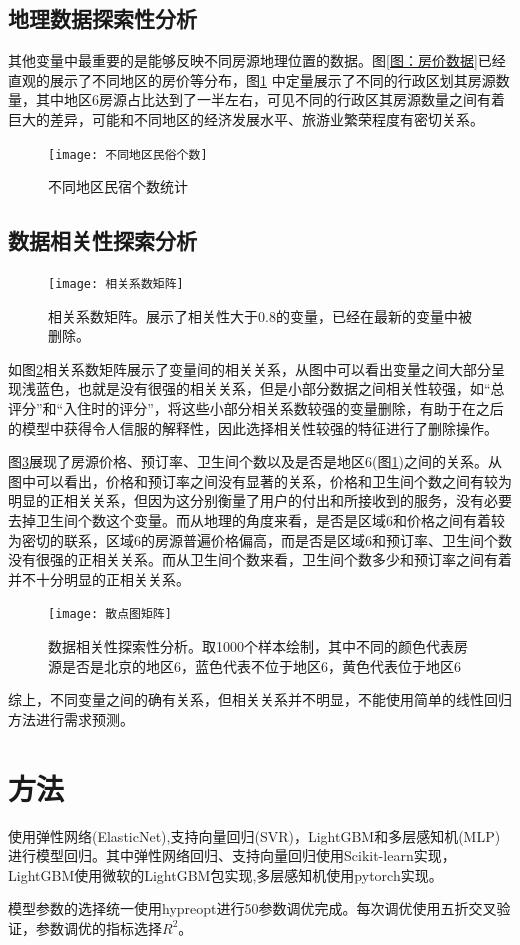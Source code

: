 \documentclass{article}
\begin{document}
\begin{multicols}{2}
\subsection{地理数据探索性分析}
其他变量中最重要的是能够反映不同房源地理位置的数据。图\ref{图：房价数据}已经直观的展示了不同地区的房价等分布，图\ref{fig:不同地区民宿个数} 中定量展示了不同的行政区划其房源数量，其中地区6房源占比达到了一半左右，可见不同的行政区其房源数量之间有着巨大的差异，可能和不同地区的经济发展水平、旅游业繁荣程度有密切关系。
\begin{figure}[H]
	\centering
	\texttt{[image: 不同地区民俗个数]}
	\caption{不同地区民宿个数统计}
	\label{fig:不同地区民宿个数}
\end{figure}
\subsection{数据相关性探索分析}
\begin{figure}
	\centering
	\texttt{[image: 相关系数矩阵]}
	\caption{相关系数矩阵。展示了相关性大于0.8的变量，已经在最新的变量中被删除。}
	\label{fig:相关系数矩阵}
\end{figure}
如图\ref{fig:相关系数矩阵}相关系数矩阵展示了变量间的相关关系，从图中可以看出变量之间大部分呈现浅蓝色，也就是没有很强的相关关系，但是小部分数据之间相关性较强，如“总评分”和“入住时的评分”，将这些小部分相关系数较强的变量删除，有助于在之后的模型中获得令人信服的解释性，因此选择相关性较强的特征进行了删除操作。
\par 图\ref{fig:散点图矩阵}展现了房源价格、预订率、卫生间个数以及是否是地区6(图\ref{fig:不同地区民宿个数})之间的关系。从图中可以看出，价格和预订率之间没有显著的关系，价格和卫生间个数之间有较为明显的正相关关系，但因为这分别衡量了用户的付出和所接收到的服务，没有必要去掉卫生间个数这个变量。而从地理的角度来看，是否是区域6和价格之间有着较为密切的联系，区域6的房源普遍价格偏高，而是否是区域6和预订率、卫生间个数没有很强的正相关关系。而从卫生间个数来看，卫生间个数多少和预订率之间有着并不十分明显的正相关关系。
\begin{figure}[!htbp]
	\centering
	\texttt{[image: 散点图矩阵]}
	\caption{数据相关性探索性分析。取1000个样本绘制，其中不同的颜色代表房源是否是北京的地区6，蓝色代表不位于地区6，黄色代表位于地区6}
	\label{fig:散点图矩阵}
\end{figure}
\par 综上，不同变量之间的确有关系，但相关关系并不明显，不能使用简单的线性回归方法进行需求预测。

\section{方法}
\par 使用弹性网络(ElasticNet),支持向量回归(SVR)，LightGBM和多层感知机(MLP)进行模型回归。其中弹性网络回归、支持向量回归使用Scikit-learn\cite{sklearn}实现，LightGBM使用微软的LightGBM包实现\cite{lightGBM},多层感知机使用pytorch\cite{pytorch}实现。
\par 模型参数的选择统一使用hypreopt进行50参数调优完成\cite{hyperopt2022Jan}。每次调优使用五折交叉验证，参数调优的指标选择$R^2$。

\end{multicols}
\end{document}
